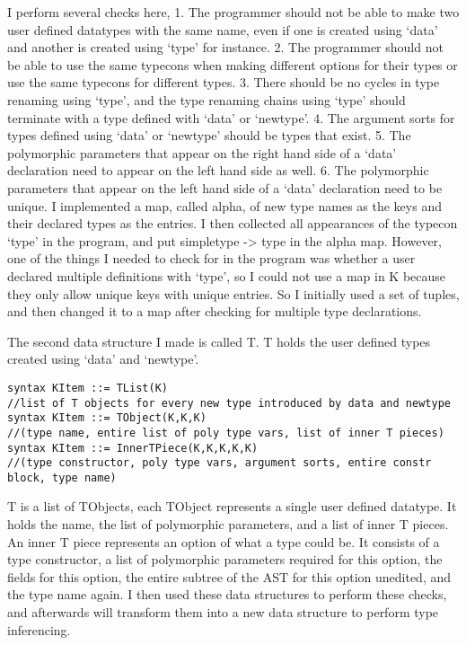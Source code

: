 I perform several checks here, 
1. The programmer should not be able to make two user defined datatypes with the same name, even if one is created using ‘data’ and another is created using ‘type’ for instance.
2. The programmer should not be able to use the same typecons when making different options for their types or use the same typecons for different types.
3. There should be no cycles in type renaming using ‘type’, and the type renaming chains using ‘type’ should terminate with a type defined with ‘data’ or ‘newtype’.
4. The argument sorts for types defined using ‘data’ or ‘newtype’ should be types that exist.
5. The polymorphic parameters that appear on the right hand side of a ‘data’ declaration need to appear on the left hand side as well.
6. The polymorphic parameters that appear on the left hand side of a ‘data’ declaration need to be unique.
I implemented a map, called alpha, of new type names as the keys and their declared types as the entries. I then collected all appearances of the typecon ‘type’ in the program, and put simpletype -> type in the alpha map. However, one of the things I needed to check for in the program was whether a user declared multiple definitions with ‘type’, so I could not use a map in K because they only allow unique keys with unique entries. So I initially used a set of tuples, and then changed it to a map after checking for multiple type declarations.


The second data structure I made is called T. T holds the user defined types created using ‘data’ and ‘newtype’.
\begin{lstlisting}
syntax KItem ::= TList(K) 
//list of T objects for every new type introduced by data and newtype
syntax KItem ::= TObject(K,K,K)
//(type name, entire list of poly type vars, list of inner T pieces)
syntax KItem ::= InnerTPiece(K,K,K,K,K)
//(type constructor, poly type vars, argument sorts, entire constr block, type name)
\end{lstlisting}
T is a list of TObjects, each TObject represents a single user defined datatype. It holds the name, the list of polymorphic parameters, and a list of inner T pieces.
An inner T piece represents an option of what a type could be. It consists of a type constructor, a list of polymorphic parameters required for this option, the fields for this option, the entire subtree of the AST for this option unedited, and the type name again.
I then used these data structures to perform these checks, and afterwards will transform them into a new data structure to perform type inferencing.

